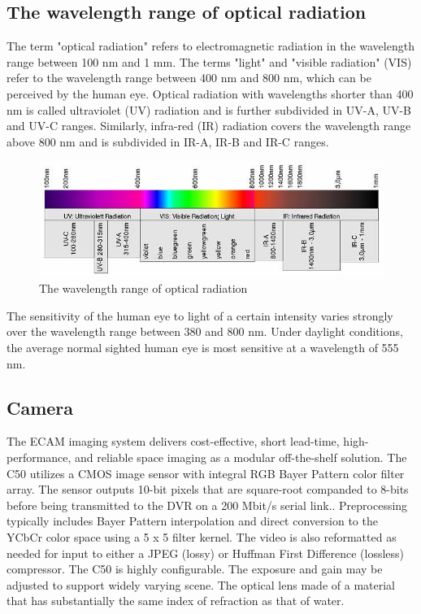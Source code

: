 \subsection{The wavelength range of optical radiation}

The term "optical radiation" refers to electromagnetic radiation in the wavelength range between 100 nm and 1 mm. The terms "light" and "visible radiation" (VIS) refer to the wavelength range between 400 nm and 800 nm, which can be perceived by the human eye. Optical radiation with wavelengths shorter than 400 nm is called ultraviolet (UV) radiation and is further subdivided in UV-A, UV-B and UV-C ranges. Similarly, infra-red (IR) radiation covers the wavelength range above 800 nm and is subdivided in IR-A, IR-B and IR-C ranges.

\begin{figure}[htb]
\centering
\includegraphics[scale=1]{figures/camera/bh8.jpg}
\caption{The wavelength range of optical radiation}
\end{figure}

The sensitivity of the human eye to light of a certain intensity varies strongly over the wavelength range between 380 and 800 nm. Under daylight conditions, the average normal sighted human eye is most sensitive at a wavelength of 555 nm.

\subsection{Camera}

The ECAM imaging system delivers cost-effective, short lead-time, high-performance, and reliable space imaging as a modular off-the-shelf solution. The C50 utilizes a CMOS image sensor with integral RGB Bayer Pattern color filter array. The sensor outputs 10-bit pixels that are square-root companded to 8-bits before being transmitted to the DVR on a 200 Mbit/s serial link.. Preprocessing typically includes Bayer Pattern interpolation and direct conversion to the YCbCr color space using a 5 x 5 filter kernel. The video is also reformatted as needed for input to either a JPEG (lossy) or Huffman First Difference (lossless) compressor. The C50 is highly configurable. The exposure and gain may be adjusted to support widely varying scene.
The optical lens made of a material that has substantially the same index of refraction as that of water.

